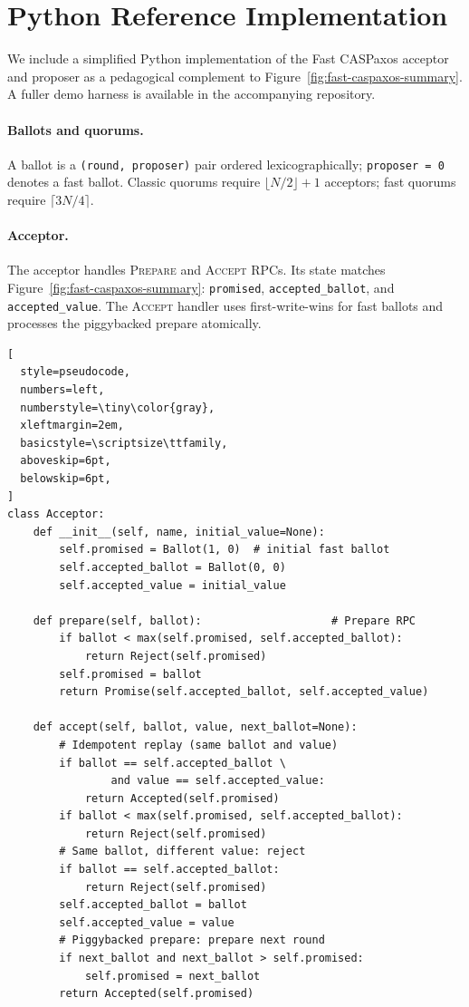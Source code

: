 \section{Python Reference Implementation}
\label{sec:python-implementation}

We include a simplified Python implementation of the Fast CASPaxos acceptor and proposer as a pedagogical complement to Figure~\ref{fig:fast-caspaxos-summary}.
A fuller demo harness is available in the accompanying repository.

\paragraph{Ballots and quorums.}
A ballot is a \texttt{(round, proposer)} pair ordered lexicographically; \texttt{proposer\,=\,0} denotes a fast ballot.
Classic quorums require $\lfloor N/2 \rfloor + 1$ acceptors; fast quorums require $\lceil 3N/4 \rceil$.

\paragraph{Acceptor.}
The acceptor handles \textsc{Prepare} and \textsc{Accept} RPCs.
Its state matches Figure~\ref{fig:fast-caspaxos-summary}: \texttt{promised}, \texttt{accepted\_ballot}, and \texttt{accepted\_value}.
The \textsc{Accept} handler uses first-write-wins for fast ballots and processes the piggybacked prepare atomically.

\begin{lstlisting}[
  style=pseudocode,
  numbers=left,
  numberstyle=\tiny\color{gray},
  xleftmargin=2em,
  basicstyle=\scriptsize\ttfamily,
  aboveskip=6pt,
  belowskip=6pt,
]
class Acceptor:
    def __init__(self, name, initial_value=None):
        self.promised = Ballot(1, 0)  # initial fast ballot
        self.accepted_ballot = Ballot(0, 0)
        self.accepted_value = initial_value

    def prepare(self, ballot):                    # Prepare RPC
        if ballot < max(self.promised, self.accepted_ballot):
            return Reject(self.promised)
        self.promised = ballot
        return Promise(self.accepted_ballot, self.accepted_value)

    def accept(self, ballot, value, next_ballot=None):
        # Idempotent replay (same ballot and value)
        if ballot == self.accepted_ballot \
                and value == self.accepted_value:
            return Accepted(self.promised)
        if ballot < max(self.promised, self.accepted_ballot):
            return Reject(self.promised)
        # Same ballot, different value: reject
        if ballot == self.accepted_ballot:
            return Reject(self.promised)
        self.accepted_ballot = ballot
        self.accepted_value = value
        # Piggybacked prepare: prepare next round
        if next_ballot and next_ballot > self.promised:
            self.promised = next_ballot
        return Accepted(self.promised)
\end{lstlisting}

